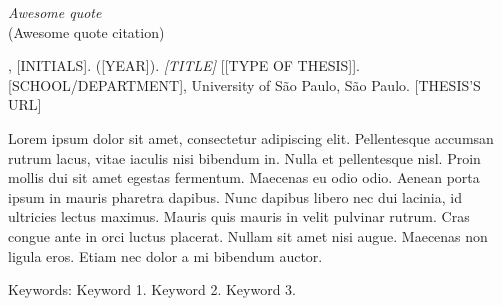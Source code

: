 
\begin{epigrafe}
  \vspace*{\fill}
	\begin{flushright}
	  \textit{Awesome quote} \\
		(Awesome quote citation)
	\end{flushright}
\end{epigrafe}


\setlength{\absparsep}{18pt}
\begin{resumo}

\begin{flushleft}
[SURNAME], [INITIALS]. ([YEAR]). \textit{[TITLE]} [[TYPE OF THESIS]]. [SCHOOL/DEPARTMENT], University of São Paulo, São Paulo. [THESIS'S URL]
\end{flushleft}

Lorem ipsum dolor sit amet, consectetur adipiscing elit. Pellentesque accumsan rutrum lacus, vitae iaculis nisi bibendum in. Nulla et pellentesque nisl. Proin mollis dui sit amet egestas fermentum. Maecenas eu odio odio. Aenean porta ipsum in mauris pharetra dapibus. Nunc dapibus libero nec dui lacinia, id ultricies lectus maximus. Mauris quis mauris in velit pulvinar rutrum. Cras congue ante in orci luctus placerat. Nullam sit amet nisi augue. Maecenas non ligula eros. Etiam nec dolor a mi bibendum auctor.

Keywords: Keyword 1. Keyword 2. Keyword 3.
\end{resumo}


